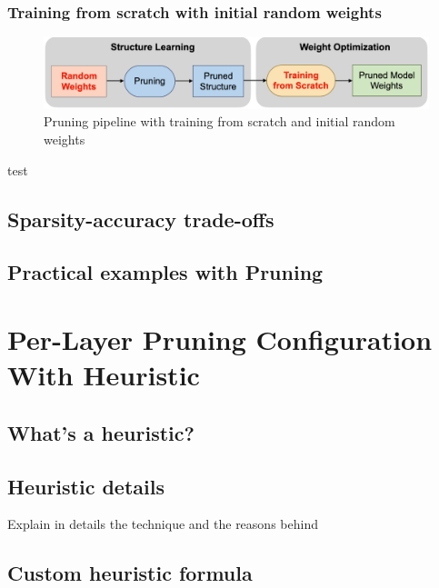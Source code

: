 \subsubsection{Training from scratch with initial random weights}
\begin{figure}[ht]
    \includegraphics[width=\textwidth]{images/pruning/scratch_pipeline.png}
    \centering
    \caption{Pruning pipeline with training from scratch and initial random weights}\label{fig:scratch_pipeline}
\end{figure}
test~\cite{Wang_2020}




\subsection{Sparsity-accuracy trade-offs}\label{subsec:tradeoff}
\lipsum[1]

\subsection{Practical examples with Pruning}
\lipsum[1]

\section{Per-Layer Pruning Configuration With Heuristic}\label{sec:heuristic}
\lipsum[1]

\subsection{What's a heuristic?}
\lipsum[1]

\subsection{Heuristic details}
Explain in details the technique and the reasons behind
\lipsum[1]

\subsection{Custom heuristic formula}
\lipsum[1]
